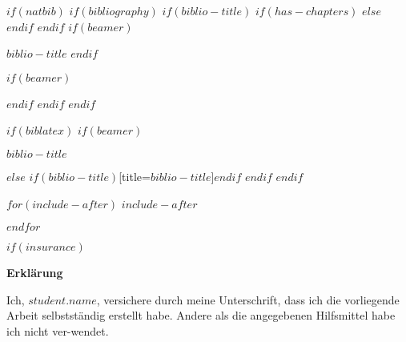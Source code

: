 \documentclass[
    12pt,
    a4paper,
    $if(lang)$
    $babel-lang$,
    $endif$
    bibliography=totocnumbered,
    listof=totocnumbered
]{scrartcl}
\def \studentname{$student.firstname$ $student.lastname$}
\def \studentname{$student.name$}
\begin{document}
$if(natbib)$
    $if(bibliography)$
        $if(biblio-title)$
            $if(has-chapters)$
\renewcommand\bibname{$biblio-title$}
            $else$
\renewcommand\refname{$biblio-title$}
            $endif$
        $endif$
        $if(beamer)$
\begin{frame}[allowframebreaks]{$biblio-title$}
  \bibliographytrue
        $endif$
  
        $if(beamer)$
\end{frame}
        $endif$
    $endif$
$endif$

$if(biblatex)$
    $if(beamer)$
\begin{frame}[allowframebreaks]{$biblio-title$}
  \bibliographytrue
  \printbibliography[heading=none]
\end{frame}
    $else$
\printbibliography$if(biblio-title)$[title=$biblio-title$]$endif$
    $endif$
$endif$

$for(include-after)$
$include-after$

$endfor$




%	


$if(insurance)$
\newpage
\thispagestyle{empty}
\begin{center}
	\vspace*{5em}
	\huge\textbf{Erklärung}\\
\end{center}
\vspace{2em}
Ich, \studentname,  versichere  durch  meine  Unterschrift,  dass  ich  die  vorliegende Arbeit selbstständig erstellt habe. Andere als die angegebenen Hilfsmittel habe ich nicht ver-wendet. 
\end{document}
